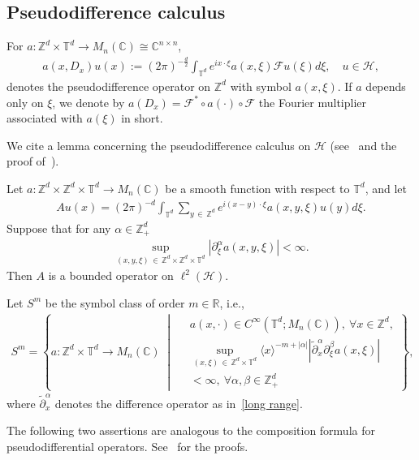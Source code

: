 \documentclass[10pt,a4paper]{amsart}
\renewcommand{\a}{\alpha}
\renewcommand{\b}{\beta}
\newcommand{\x}{\xi}
\newcommand{\C}{\mathbb{C}}
\newcommand{\R}{\mathbb{R}}
\newcommand{\Z}{\mathbb{Z}}
\newcommand{\T}{\mathbb{T}}
\newcommand{\HS}{\mathcal{H}}
\newcommand{\FS}{\mathcal{F}}
\newcommand{\jap}[1]{\langle #1 \rangle}
\let\oldforall\forall
\renewcommand*{\forall}{\mathrel{\oldforall}}
\begin{document}
\subsection{Pseudodifference calculus}

For $a:\Z^d \times \T^d \to M_n(\C)\cong \C^{n\times n}$,
\begin{align*}
a(x,D_x)u(x) :=(2\pi)^{-\frac{d}{2}}\int_{\T^d} e^{ix\cdot\x} a(x,\x) \FS u(\x)d\x, \quad u\in \HS,
\end{align*}
denotes the pseudodifference operator on $\Z^d$ with symbol $a(x,\x)$. If $a$ depends only on $\x$, we denote by $a(D_x)=\FS^*\circ a(\cdot) \circ \FS$ the Fourier multiplier associated with $a(\x)$ in short.

We cite a lemma concerning the pseudodifference calculus on $\HS$ (see~\cite[Theorem~4.2.10]{R-T} and the proof of~\cite[Lemma~2.2]{T1}).

\begin{lemm}\label{PDO lemma}
Let $a:\Z^d\times\Z^d\times\T^d \to M_n(\C)$ be a smooth function with respect to $\T^d$, and let
\begin{align*}
Au(x) = (2\pi)^{-d} \int_{\T^d} \sum_{y\,\in\,\Z^d} e^{i(x-y)\cdot\x} a(x,y,\x) u(y)d\x.
\end{align*}
Suppose that for any $\a\in\Z_+^d$
\begin{align}\label{S^0}
\sup_{(x,y,\x)\,\in\,\Z^d\times\Z^d\times\T^d}\left|\partial_{\x}^\a a(x,y,\x)\right| < \infty.
\end{align}
Then $A$ is a bounded operator on $\ell^2(\HS)$.
\end{lemm}

Let $S^m$ be the symbol class of order $m\in\R$, i.e.,
\begin{align*}
S^m=\left\{ a: \Z^d\times\T^d \to M_n(\C) \;\middle|\;
\begin{aligned}
& a(x,\cdot)\in C^\infty\left(\T^d;M_n(\C)\right),\ \forall x\in\Z^d,\\ 
&\sup_{(x,\x)\,\in\,\Z^d\times\T^d} \jap{x}^{-m+|\a|} 
\left|\tilde\partial_{x}^\a\partial_{\x}^\b a(x,\x)\right|\\
&< \infty,\ \forall \a,\b\in\Z_+^d
\end{aligned}
\right\},
\end{align*}
where $\tilde\partial_{x}^\a$ denotes the difference operator as in~\eqref{long range}.

The following two assertions are analogous to the composition formula for pseudodifferential operators. See~\cite[Theorems~4.7.3 and 4.7.10]{R-T} for the proofs.
\end{document}
